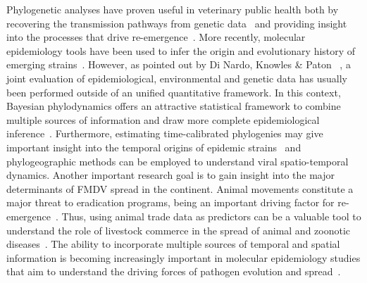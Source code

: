 \documentclass[10pt]{article}
\begin{document}
Phylogenetic analyses have proven useful in veterinary public health both by recovering the transmission pathways from genetic data~\cite{cottam2007, cottam2008} and providing insight into the processes that drive re-emergence~\cite{combining}.
More recently, molecular epidemiology tools have been used to infer the origin and evolutionary history of emerging strains~\cite{Perez2001, Malirat2007, andean, Malirat2011, Maradei2013}.
However, as pointed out by Di Nardo, Knowles \& Paton ~\cite{combining}, a joint evaluation of epidemiological, environmental and genetic data has usually been performed outside of an unified quantitative framework.
In this context, Bayesian phylodynamics offers an attractive statistical framework to combine multiple sources of information and draw more complete epidemiological inference~\cite{grenfell, vphylodynamics}.
Furthermore, estimating time-calibrated phylogenies may give important insight into the temporal origins of epidemic strains~\cite{grenfell, vphylodynamics} and phylogeographic methods can be employed to understand viral spatio-temporal dynamics.
Another important research goal is to gain insight into the major determinants of FMDV spread in the continent.
Animal movements constitute a major threat to eradication programs, being an important driving factor for re-emergence~\cite{movements}.
Thus, using animal trade data as predictors can be a valuable tool to understand the role of livestock commerce in the spread of animal and zoonotic diseases~\cite{Nelson2011}.
The ability to incorporate multiple sources of temporal and spatial information is becoming increasingly important in molecular epidemiology studies that aim to understand the driving forces of pathogen evolution and spread~\cite{towards, combining, MEP, roots}.
\end{document}
